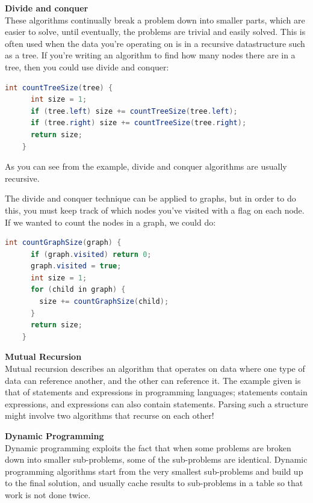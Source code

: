 \begin{description}
  \item \textbf{Divide and conquer}\\
  These algorithms continually break a problem down into smaller parts, which
  are easier to solve, until eventually, the problems are trivial and easily
  solved. This is often used when the data you're operating on is in a
  recursive datastructure such as a tree. If you're writing an algorithm to
  find how many nodes there are in a tree, then you could use divide and
  conquer:

  \begin{lstlisting}[language=java]
    int countTreeSize(tree) {
      int size = 1;
      if (tree.left) size += countTreeSize(tree.left);
      if (tree.right) size += countTreeSize(tree.right);
      return size;
    }
  \end{lstlisting}

  As you can see from the example, divide and conquer algorithms are usually
  recursive.

  The divide and conquer technique can be applied to graphs, but in order to
  do this, you must keep track of which nodes you've visited with a flag on
  each node. If we wanted to count the nodes in a graph, we could do:

  \begin{lstlisting}[language=java]
    int countGraphSize(graph) {
      if (graph.visited) return 0;
      graph.visited = true;
      int size = 1;
      for (child in graph) {
        size += countGraphSize(child);
      }
      return size;
    }
  \end{lstlisting}

  \item \textbf{Mutual Recursion}\\
  Mutual recursion describes an algorithm that operates on data where one type
  of data can reference another, and the other can reference it. The example
  given is that of statements and expressions in programming languages;
  statements contain expressions, and expressions can also contain statements.
  Parsing such a structure might involve two algorithms that recurse on each
  other!

  \item \textbf{Dynamic Programming}\\
  Dynamic programming exploits the fact that when some problems are broken
  down into smaller sub-problems, some of the sub-problems are identical.
  Dynamic programming algorithms start from the very smallest sub-problems and
  build up to the final solution, and usually cache results to sub-problems in
  a table so that work is not done twice.

\end{description}

